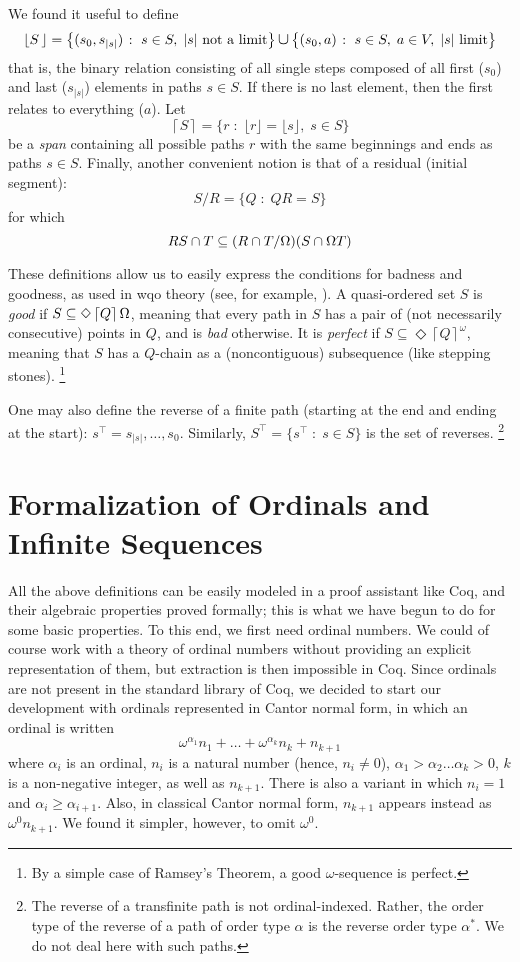 \documentclass{llncs}
\newcommand{\Span}[1]{\left\lceil#1\right\rceil}
\newcommand{\ABC}{V}
\let\om=\Omega
\renewcommand{\Omega}{{\rm\om}}
\newcommand{\Bang}[1]{\mathop!#1}
\begin{document}
We found it useful to define
\[
\lfloor S\,\rfloor =\big\{(s_0, s_{|s|}) \;\colon\; s\in S,\;|s| \mbox{ not a limit}\big\} \mathop{\mathlarger{\cup}} \big\{(s_0, a) \;\colon\; s\in S,\; a\in\ABC,\;|s|\mbox{ limit}\big\} 
\]
that is, the binary relation
consisting of all single steps composed of all first ($s_0$) and last ($s_{|s|}$) elements 
in paths $s\in S$.
If there is no last element, then the first relates to everything ($a$).
Let
\[
\Span S = \{r \;\colon\; \lfloor r\rfloor=\lfloor s\rfloor,\; s\in S\}
\]
be a \emph{span}
containing all possible paths $r$ with the same beginnings and ends
as paths $s\in S$.
Finally, another convenient notion is that of a residual (initial segment):
\[
S/R = \{Q \;\colon\; QR=S\} 
\]
for which
\[
R S  \cap T \subseteq (R\cap T /\Omega)(S\cap\Omega T)
\]

These definitions allow us to easily express the conditions for badness and goodness, as used in wqo  theory (see, for example, \cite[Chap.\ 12]{Graph}). A quasi-ordered set
$S$ is \emph{good} if $S \subseteq \Diamond \Span Q \Omega$, 
meaning that every path in $S$ has a pair of (not necessarily consecutive) points in $Q$,
and is \emph{bad} otherwise.
It is 
\emph{perfect} if $S \subseteq \Diamond {\Span Q}^\omega$,
meaning that $S$ has a $Q$-chain as a (noncontiguous) subsequence (like stepping stones).%
\footnote{By a simple case of Ramsey's Theorem, a good $\omega$-sequence is perfect.}

One may also define
the reverse of a finite path (starting at the end and ending at the start):
$s^\intercal = s_{|s|},\dots,s_0$.
Similarly,
$S^\intercal =\{s^\intercal \;\colon\; s\in S\}$ is the set of reverses.%
\footnote{The reverse of a transfinite path is not ordinal-indexed.
Rather, the order type of the reverse of a path of order type $\alpha$ is the
reverse order type $\alpha^\ast$.
We do not deal here with such paths.}
 
\section{Formalization of Ordinals and Infinite Sequences}
 
All the above definitions can be easily modeled in a proof assistant
like Coq, and their algebraic properties proved formally; this is what
we have begun to do for some basic properties. To this end, we first need
ordinal numbers. We could of course work with a theory of ordinal
numbers without providing  an explicit representation of them, but
extraction is then impossible in Coq. Since ordinals are not present
in the standard library of Coq, we decided to start our development
with ordinals represented in Cantor normal form, in which an ordinal
is written
\[\omega^{\alpha_1}n_1 + \ldots + \omega^{\alpha_k}n_k + n_{k+1}\]
where $\alpha_i$ is an ordinal, $n_i$ is a natural number (hence,
$n_i\neq 0$), $\alpha_1 > \alpha_2\ldots \alpha_k > 0$, $k$ is a
non-negative integer, as well as $n_{k+1}$. There is also a variant in
which $n_i=1$ and $\alpha_i\geq\alpha_{i+1}$. Also, in classical
Cantor normal form, $n_{k+1}$ appears instead as
$\omega^{0}n_{k+1}$. We found it simpler, however, to omit $\omega^0$.
\end{document}
